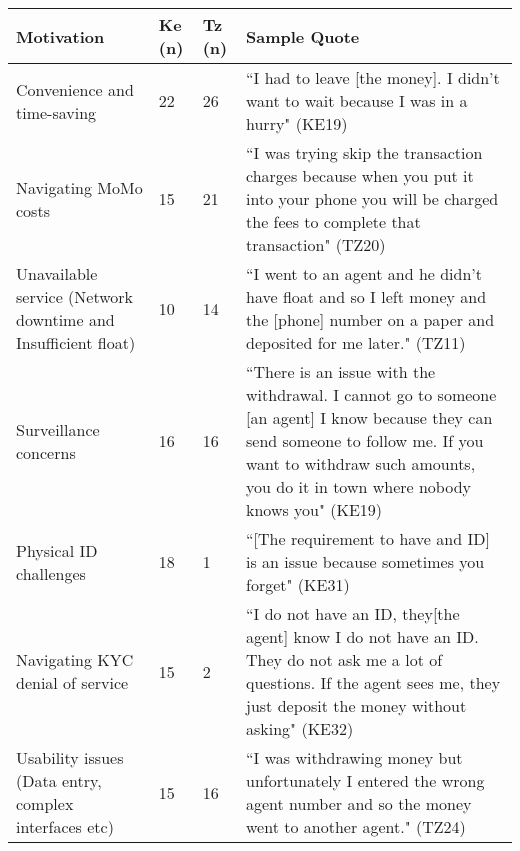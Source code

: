 \begin {table*} [htbp]
\caption{Top seven motivations for pursuing workarounds}
\centering
\begin {tabular} {|p{5cm}|l|l|p{9cm}|}
\hline
\textbf{Motivation}& \textbf{Ke (n)}& \textbf{Tz (n)}& \textbf{Sample Quote}\\
 \hline
 \hline
Convenience and time-saving& 22& 26&  ``I had to leave [the money]. I didn’t want to wait because I was in a hurry" (KE19) \\
\hline
Navigating MoMo costs&15 & 21& ``I was trying skip the transaction charges because when you put it into your phone you will be charged the fees to complete that transaction" (TZ20)  \\
\hline
Unavailable service (Network downtime and Insufficient float)& 10& 14& ``I went to an agent and he didn’t have float and so I left money and the [phone] number on a paper and deposited for me later." (TZ11) \\
\hline
Surveillance concerns& 16& 16& ``There is an issue with the withdrawal. I cannot go to someone [an agent] I know because they can send someone to follow me. If you want to withdraw such amounts, you do it in town where nobody knows you" (KE19) \\
\hline
Physical ID challenges& 18& 1& ``[The requirement to have and ID] is an issue because sometimes you forget" (KE31) \\
\hline
Navigating KYC denial of service& 15& 2& ``I do not have an ID, they[the agent] know I do not have an ID. They do not ask me a lot of questions. If the agent sees me, they just deposit the money without asking" (KE32) \\
\hline
Usability issues (Data entry, complex interfaces etc)&15 & 16& ``I was withdrawing money but unfortunately I entered the wrong agent number and so the money went to another agent." (TZ24) \\
\hline
 \end{tabular}
\label{table:tab2workaroundmotivations}
\end{table*}

